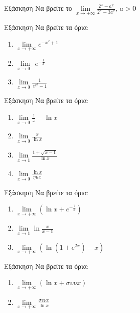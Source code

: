 \documentclass[greek]{beamer}
\begin{document}
\begin{frame}{Εξάσκηση}
 Να βρείτε το $\lim\limits_{x \to +\infty}{ \frac{2^x-a^x}{2^x+3a^x}  }$, $a>0$
\end{frame}

\begin{frame}{Εξάσκηση}
 Να βρείτε τα όρια:
 \begin{enumerate}
  \item $\lim\limits_{x \to +\infty}{ e^{-x^2+1} }$ \pause
  \item $\lim\limits_{x \to 0^-}{ e^{-\frac{1}{x}} }$\pause
  \item $\lim\limits_{x \to 0}{ \frac{1}{e^{x^2}-1}}$
 \end{enumerate}
\end{frame}

\begin{frame}{Εξάσκηση}
 Να βρείτε τα όρια:
 \begin{enumerate}
  \item $\lim\limits_{x \to 0}{ \frac{1}{x}-\ln x }$ \pause
  \item $\lim\limits_{x \to 0}{ \frac{x}{\ln x} }$\pause
  \item $\lim\limits_{x \to 1}{ \frac{1+\sqrt{x-1}}{\ln x}}$\pause
  \item $\lim\limits_{x \to 0}{ \frac{\ln x}{ημx}}$
 \end{enumerate}
\end{frame}

\begin{frame}{Εξάσκηση}
 Να βρείτε τα όρια:
 \begin{enumerate}
  \item $\lim\limits_{x \to +\infty}{\left(    \ln x + e^{-\frac{1}{x}} \right)}$ \pause
  \item $\lim\limits_{x \to 1}{ \ln\frac{x}{x-1} }$\pause
  \item $\lim\limits_{x \to +\infty}{\left( \ln (1+e^{2x})-x \right)}$
 \end{enumerate}
\end{frame}

\begin{frame}{Εξάσκηση}
 Να βρείτε τα όρια:
 \begin{enumerate}
  \item $\lim\limits_{x \to +\infty}{\left( \ln x+συνx \right)}$ \pause
  \item $\lim\limits_{x \to +\infty}{ \frac{συνx}{\ln x} }$
 \end{enumerate}
\end{frame}
\end{document}
